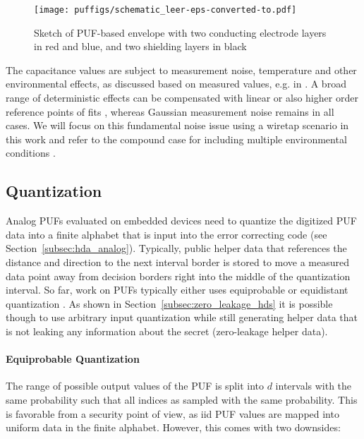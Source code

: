 \begin{figure}
	\centering
	\texttt{[image: puffigs/schematic\_leer-eps-converted-to.pdf]}
	\caption{Sketch of PUF-based envelope \cite{IOK+18} with two conducting electrode layers in red and blue, and two shielding layers in black}
	\label{fig:pufenv}
\end{figure}

The capacitance values are subject to measurement noise, temperature and other environmental effects, as discussed based on measured values, e.g. in \cite{GXKF22}. A broad range of deterministic effects can be compensated with linear or also higher order reference points of fits \cite{OIHS18,GXKF22,riehm2023structured,gunlu2015reliable}, whereas Gaussian measurement noise remains in all cases. We will focus on this fundamental noise issue using a wiretap scenario in this work and refer to the compound case for including multiple environmental conditions \cite{liang2009compound,boche2013secret}.

\subsection{Quantization}

Analog PUFs evaluated on embedded devices need to quantize the digitized PUF data into a finite alphabet that is input into the error correcting code (see Section~\ref{subsec:hda_analog}). Typically, public helper data that references the distance and direction to the next interval border is stored to move a measured data point away from decision borders right into the middle of the quantization interval. So far, work on PUFs typically either uses equiprobable or equidistant quantization \cite{IHKS16}. As shown in Section~\ref{subsec:zero_leakage_hds} it is possible though to use arbitrary input quantization while still generating helper data that is not leaking any information about the secret (zero-leakage helper data).

\paragraph{Equiprobable Quantization} The range of possible output values of the PUF is split into $d$ intervals with the same probability such that all indices as sampled with the same probability. This is favorable from a security point of view, as iid PUF values are mapped into uniform data in the finite alphabet. However, this comes with two downsides: 

